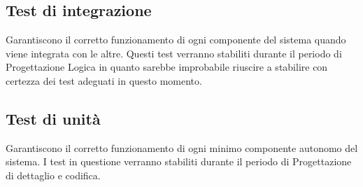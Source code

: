 \documentclass[../piano-di-qualifica.tex]{subfiles}
\begin{document}
\subsection{Test di integrazione}
\label{sub:test_di_integrazione}
Garantiscono il corretto funzionamento di ogni componente del sistema quando viene integrata con le altre.
Questi test verranno stabiliti durante il periodo di Progettazione Logica in quanto sarebbe improbabile riuscire a stabilire con certezza dei test adeguati in questo momento.

\subsection{Test di unità}
\label{sub:test_di_unita}
Garantiscono il corretto funzionamento di ogni minimo componente autonomo del sistema.
I test in questione verranno stabiliti durante il periodo di Progettazione di dettaglio e codifica.
\end{document}
